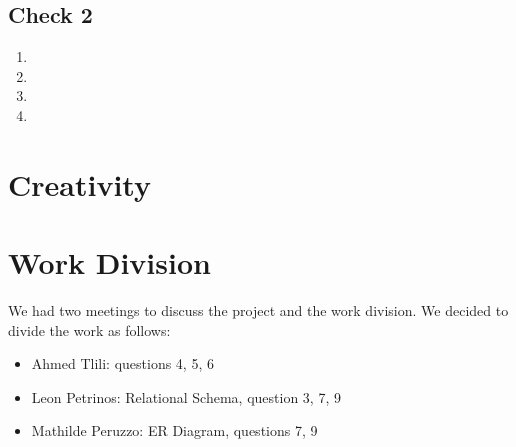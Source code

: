 \documentclass[a4paper,11pt]{article}
\begin{document}
\subsection*{Check 2}
\begin{enumerate}[label=(\alph*)]
    \item
    \item
    \item
    \item
\end{enumerate}

\section{Creativity}

\section{Work Division}
We had two meetings to discuss the project and the work division. We decided to divide the work as follows:
\begin{itemize}
    \item Ahmed Tlili: questions 4, 5, 6
    \item Leon Petrinos: Relational Schema, question 3, 7, 9
    \item Mathilde Peruzzo: ER Diagram, questions 7, 9
\end{itemize}
\end{document}
